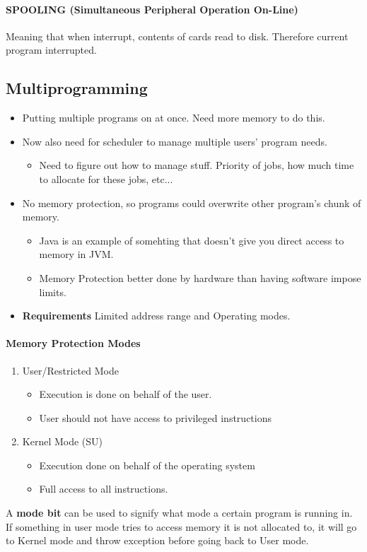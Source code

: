 \documentclass{article}
\newcommand\tab[1][0.5cm]{\hspace*{#1}}
\begin{document}
		\paragraph{\tab SPOOLING (Simultaneous Peripheral Operation On-Line)}
			Meaning that when interrupt, contents of cards read to disk.
			Therefore current program interrupted.

	\subsection{Multiprogramming}
		\begin{itemize}
			\item Putting multiple programs on at once. Need more memory to do this.
			\item Now also need for scheduler to manage multiple users' program needs.
			\begin{itemize}
				\item Need to figure out how to manage stuff. Priority of jobs, how much time to allocate for these jobs, etc...
			\end{itemize}
			\item No memory protection, so programs could overwrite other program's chunk of memory.
			\begin{itemize}
				\item Java is an example of somehting that doesn't give you direct access to memory in JVM.
				\item Memory Protection better done by hardware than having software impose limits. 
			\end{itemize}
			\item \textbf{Requirements} Limited address range and Operating modes.
		\end{itemize}

		\paragraph{\tab Memory Protection Modes}
		\begin{enumerate}
			\item User/Restricted Mode
			\begin{itemize}
				\item Execution is done on behalf of the user.
				\item User should not have access to privileged instructions
			\end{itemize}
			\item Kernel Mode (SU)
			\begin{itemize}
				\item Execution done on behalf of the operating system
				\item Full access to all instructions.
			\end{itemize}
		\end{enumerate}
		A \textbf{mode bit} can be used to signify what mode a certain program is running in. If something in user mode tries to access memory it is not allocated to, it will go to Kernel mode and throw exception before going back to User mode.
\end{document}
